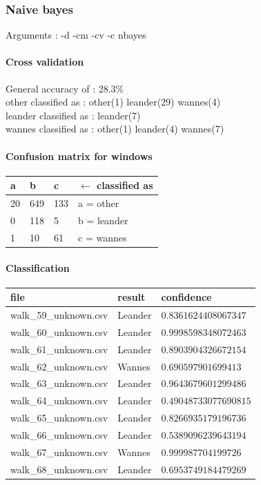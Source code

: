 \subsubsection{Naive bayes}
Arguments : -d -cm -cv -c nbayes 
\paragraph{Cross validation}
General accuracy of : 28.3\%\\
other classified as : other(1) leander(29) wannes(4) \\
leander classified as : leander(7) \\
wannes classified as : other(1) leander(4) wannes(7) 

\paragraph{Confusion matrix for windows}

\begin{tabular}{l l l | l}
    a &    b &   c & $\leftarrow$ classified as \\
    \hline
   20 &  649 & 133 &    a = other \\
    0 &  118 &   5 &    b = leander \\
    1 &   10 &  61 &    c = wannes
\end{tabular}

\paragraph{Classification}
\begin{tabular}{l | l | l}
    file & result & confidence\\ 
    \hline 
    walk\_59\_unknown.csv & Leander & $0.8361624408067347$ \\
    walk\_60\_unknown.csv & Leander & $0.9998598348072463$ \\
    walk\_61\_unknown.csv & Leander & $0.8903904326672154$ \\
    walk\_62\_unknown.csv & Wannes  & $0.690597901699413$ \\
    walk\_63\_unknown.csv & Leander & $0.9643679601299486$ \\
    walk\_64\_unknown.csv & Leander & $0.49048733077690815$ \\
    walk\_65\_unknown.csv & Leander & $0.8266935179196736$ \\
    walk\_66\_unknown.csv & Leander & $0.5389096239643194$ \\
    walk\_67\_unknown.csv & Wannes  & $0.999987704199726$ \\
    walk\_68\_unknown.csv & Leander & $0.6953749184479269$
\end{tabular}

